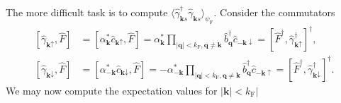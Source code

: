 \documentclass[english, parskip=full]{scrartcl}
\renewcommand{\bra}{}
\newcommand{\klam}{}
\newcommand{\tecxt}{}
\begin{document}
The more difficult task is to compute $\bra\langle \hat{\gamma}_{\mathbf{k}s}^\dagger \hat{\gamma}_{\mathbf{k}s} \rangle_{\psi_\tecxt\text{F}}$.
Consider the commutators
\begin{align}
\klam\left[ \hat{\gamma}_{\textbf{k}\uparrow}, \hat{F} \right] &= \klam\left[ \alpha_\textbf{k}^\ast \hat{c}_{\textbf{k}\uparrow}, \hat{F} \right] = \alpha_\textbf{k}^\ast \prod_{|\textbf{q}| < k_\tecxt\text{F}, \textbf{q}\neq \textbf{k}} \hat{b}_{\textbf{q}}^\dagger \hat{c}_{-\textbf{k}\downarrow} = \klam\left[ \hat{F}^\dagger, \hat{\gamma}_{\textbf{k}\uparrow}^\dagger \right]^\dagger,\\
\klam\left[ \hat{\gamma}_{\textbf{k}\downarrow}, \hat{F} \right] &= \klam\left[ \alpha_{-\textbf{k}}^\ast \hat{c}_{\textbf{k}\downarrow}, \hat{F} \right] = -\alpha_{-\textbf{k}}^\ast \prod_{|\textbf{q}| < k_\tecxt\text{F}, \textbf{q}\neq \textbf{k}} \hat{b}_{\textbf{q}}^\dagger \hat{c}_{-\textbf{k}\uparrow} = \klam\left[ \hat{F}^\dagger, \hat{\gamma}_{\textbf{k}\downarrow}^\dagger \right]^\dagger .
\end{align}
We may now compute the expectation values for $|\textbf{k}| < k_\tecxt\text{F}|$
\end{document}
